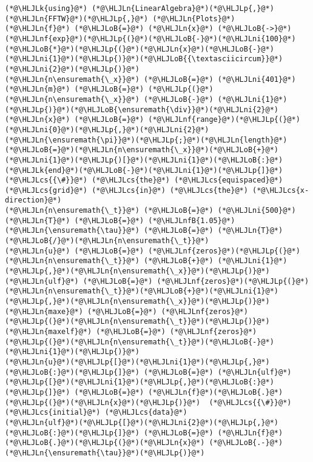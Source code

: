 \documentclass[12pt,a4paper]{article}
\newcommand{\HLJLk}[1]{\textcolor[RGB]{148,91,176}{\textbf{#1}}}
\newcommand{\HLJLn}[1]{#1}
\newcommand{\HLJLnf}[1]{\textcolor[RGB]{66,102,213}{#1}}
\newcommand{\HLJLnfB}[1]{\textcolor[RGB]{59,151,46}{#1}}
\newcommand{\HLJLni}[1]{\textcolor[RGB]{59,151,46}{#1}}
\newcommand{\HLJLoB}[1]{\textcolor[RGB]{102,102,102}{\textbf{#1}}}
\newcommand{\HLJLp}[1]{#1}
\newcommand{\HLJLcs}[1]{\textcolor[RGB]{153,153,119}{\textit{#1}}}
\begin{document}
\begin{lstlisting}
(*@\HLJLk{using}@*) (*@\HLJLn{LinearAlgebra}@*)(*@\HLJLp{,}@*) (*@\HLJLn{FFTW}@*)(*@\HLJLp{,}@*) (*@\HLJLn{Plots}@*)
(*@\HLJLn{f}@*) (*@\HLJLoB{=}@*) (*@\HLJLn{x}@*) (*@\HLJLoB{->}@*) (*@\HLJLnf{exp}@*)(*@\HLJLp{(}@*)(*@\HLJLoB{-}@*)(*@\HLJLni{100}@*)(*@\HLJLoB{*}@*)(*@\HLJLp{(}@*)(*@\HLJLn{x}@*)(*@\HLJLoB{-}@*)(*@\HLJLni{1}@*)(*@\HLJLp{)}@*)(*@\HLJLoB{{\textasciicircum}}@*)(*@\HLJLni{2}@*)(*@\HLJLp{)}@*)
(*@\HLJLn{n\ensuremath{\_x}}@*) (*@\HLJLoB{=}@*) (*@\HLJLni{401}@*)
(*@\HLJLn{m}@*) (*@\HLJLoB{=}@*) (*@\HLJLp{(}@*)(*@\HLJLn{n\ensuremath{\_x}}@*) (*@\HLJLoB{-}@*) (*@\HLJLni{1}@*)(*@\HLJLp{)}@*)(*@\HLJLoB{\ensuremath{\div}}@*)(*@\HLJLni{2}@*)
(*@\HLJLn{x}@*) (*@\HLJLoB{=}@*) (*@\HLJLnf{range}@*)(*@\HLJLp{(}@*)(*@\HLJLni{0}@*)(*@\HLJLp{,}@*)(*@\HLJLni{2}@*)(*@\HLJLn{\ensuremath{\pi}}@*)(*@\HLJLp{;}@*)(*@\HLJLn{length}@*)(*@\HLJLoB{=}@*)(*@\HLJLn{n\ensuremath{\_x}}@*)(*@\HLJLoB{+}@*)(*@\HLJLni{1}@*)(*@\HLJLp{)[}@*)(*@\HLJLni{1}@*)(*@\HLJLoB{:}@*)(*@\HLJLk{end}@*)(*@\HLJLoB{-}@*)(*@\HLJLni{1}@*)(*@\HLJLp{]}@*) (*@\HLJLcs{{\#}}@*) (*@\HLJLcs{the}@*) (*@\HLJLcs{equispaced}@*) (*@\HLJLcs{grid}@*) (*@\HLJLcs{in}@*) (*@\HLJLcs{the}@*) (*@\HLJLcs{x-direction}@*)
(*@\HLJLn{n\ensuremath{\_t}}@*) (*@\HLJLoB{=}@*) (*@\HLJLni{500}@*)
(*@\HLJLn{T}@*) (*@\HLJLoB{=}@*) (*@\HLJLnfB{1.05}@*)
(*@\HLJLn{\ensuremath{\tau}}@*) (*@\HLJLoB{=}@*) (*@\HLJLn{T}@*)(*@\HLJLoB{/}@*)(*@\HLJLn{n\ensuremath{\_t}}@*)
(*@\HLJLn{u}@*) (*@\HLJLoB{=}@*) (*@\HLJLnf{zeros}@*)(*@\HLJLp{(}@*)(*@\HLJLn{n\ensuremath{\_t}}@*) (*@\HLJLoB{+}@*) (*@\HLJLni{1}@*)(*@\HLJLp{,}@*)(*@\HLJLn{n\ensuremath{\_x}}@*)(*@\HLJLp{)}@*)
(*@\HLJLn{ulf}@*) (*@\HLJLoB{=}@*) (*@\HLJLnf{zeros}@*)(*@\HLJLp{(}@*)(*@\HLJLn{n\ensuremath{\_t}}@*)(*@\HLJLoB{+}@*)(*@\HLJLni{1}@*)(*@\HLJLp{,}@*)(*@\HLJLn{n\ensuremath{\_x}}@*)(*@\HLJLp{)}@*)
(*@\HLJLn{maxe}@*) (*@\HLJLoB{=}@*) (*@\HLJLnf{zeros}@*)(*@\HLJLp{(}@*)(*@\HLJLn{n\ensuremath{\_t}}@*)(*@\HLJLp{)}@*)
(*@\HLJLn{maxelf}@*) (*@\HLJLoB{=}@*) (*@\HLJLnf{zeros}@*)(*@\HLJLp{(}@*)(*@\HLJLn{n\ensuremath{\_t}}@*)(*@\HLJLoB{-}@*)(*@\HLJLni{1}@*)(*@\HLJLp{)}@*)
(*@\HLJLn{u}@*)(*@\HLJLp{[}@*)(*@\HLJLni{1}@*)(*@\HLJLp{,}@*)(*@\HLJLoB{:}@*)(*@\HLJLp{]}@*) (*@\HLJLoB{=}@*) (*@\HLJLn{ulf}@*)(*@\HLJLp{[}@*)(*@\HLJLni{1}@*)(*@\HLJLp{,}@*)(*@\HLJLoB{:}@*)(*@\HLJLp{]}@*) (*@\HLJLoB{=}@*) (*@\HLJLn{f}@*)(*@\HLJLoB{.}@*)(*@\HLJLp{(}@*)(*@\HLJLn{x}@*)(*@\HLJLp{)}@*)  (*@\HLJLcs{{\#}}@*) (*@\HLJLcs{initial}@*) (*@\HLJLcs{data}@*)
(*@\HLJLn{ulf}@*)(*@\HLJLp{[}@*)(*@\HLJLni{2}@*)(*@\HLJLp{,}@*)(*@\HLJLoB{:}@*)(*@\HLJLp{]}@*) (*@\HLJLoB{=}@*) (*@\HLJLn{f}@*)(*@\HLJLoB{.}@*)(*@\HLJLp{(}@*)(*@\HLJLn{x}@*) (*@\HLJLoB{.-}@*) (*@\HLJLn{\ensuremath{\tau}}@*)(*@\HLJLp{)}@*)

\end{lstlisting}
\end{document}
